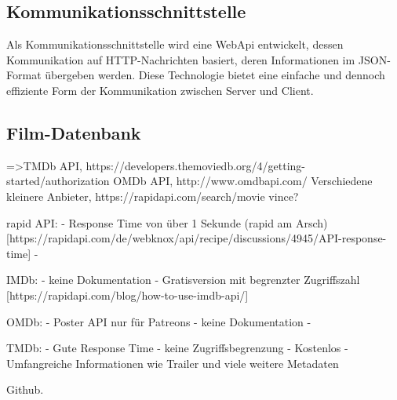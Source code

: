 \subsection{Kommunikationsschnittstelle}
Als Kommunikationsschnittstelle wird eine WebApi entwickelt, dessen Kommunikation auf HTTP-Nachrichten basiert, deren Informationen im JSON-Format übergeben werden. Diese Technologie bietet eine einfache und dennoch effiziente Form der Kommunikation zwischen Server und Client.

\subsection{Film-Datenbank}
\label{sec:filmdatenbank}
=>TMDb API, https://developers.themoviedb.org/4/getting-started/authorization\newline
OMDb API, http://www.omdbapi.com/\newline
Verschiedene kleinere Anbieter, https://rapidapi.com/search/movie\newline
    vince?
\newline

rapid API:
- Response Time von über 1 Sekunde (rapid am Arsch) [https://rapidapi.com/de/webknox/api/recipe/discussions/4945/API-response-time]
- 

IMDb:
- keine Dokumentation
- Gratisversion mit begrenzter Zugriffszahl [https://rapidapi.com/blog/how-to-use-imdb-api/]

OMDb:
- Poster API nur für Patreons 
- keine Dokumentation
- 

TMDb:
- Gute Response Time
- keine Zugriffsbegrenzung
- Kostenlos
- Umfangreiche Informationen wie Trailer und viele weitere Metadaten


Github.